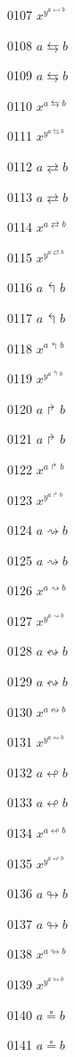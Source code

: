 \documentclass{article}
\begin{document}
0107 $x^{y^{a\leftarrowtail b}}$\par
0108 $a\leftrightarrows b$\par
0109 $\displaystyle a\leftrightarrows b$\par
0110 $x^{a\leftrightarrows b}$\par
0111 $x^{y^{a\leftrightarrows b}}$\par
0112 $a\rightleftarrows b$\par
0113 $\displaystyle a\rightleftarrows b$\par
0114 $x^{a\rightleftarrows b}$\par
0115 $x^{y^{a\rightleftarrows b}}$\par
0116 $a\Lsh b$\par
0117 $\displaystyle a\Lsh b$\par
0118 $x^{a\Lsh b}$\par
0119 $x^{y^{a\Lsh b}}$\par
0120 $a\Rsh b$\par
0121 $\displaystyle a\Rsh b$\par
0122 $x^{a\Rsh b}$\par
0123 $x^{y^{a\Rsh b}}$\par
0124 $a\rightsquigarrow b$\par
0125 $\displaystyle a\rightsquigarrow b$\par
0126 $x^{a\rightsquigarrow b}$\par
0127 $x^{y^{a\rightsquigarrow b}}$\par
0128 $a\leftrightsquigarrow b$\par
0129 $\displaystyle a\leftrightsquigarrow b$\par
0130 $x^{a\leftrightsquigarrow b}$\par
0131 $x^{y^{a\leftrightsquigarrow b}}$\par
0132 $a\looparrowleft b$\par
0133 $\displaystyle a\looparrowleft b$\par
0134 $x^{a\looparrowleft b}$\par
0135 $x^{y^{a\looparrowleft b}}$\par
0136 $a\looparrowright b$\par
0137 $\displaystyle a\looparrowright b$\par
0138 $x^{a\looparrowright b}$\par
0139 $x^{y^{a\looparrowright b}}$\par
0140 $a\circeq b$\par
0141 $\displaystyle a\circeq b$\par
\end{document}
